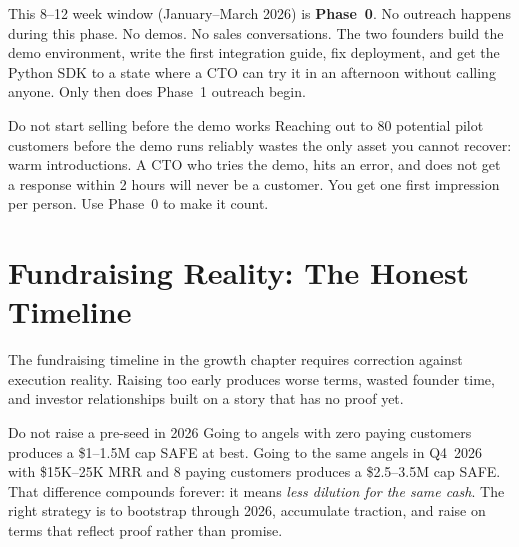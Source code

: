 \noindent This 8--12 week window (January--March 2026) is \textbf{Phase~0}.
No outreach happens during this phase. No demos. No sales conversations.
The two founders build the demo environment, write the first integration
guide, fix deployment, and get the Python SDK to a state where a CTO can
try it in an afternoon without calling anyone. Only then does Phase~1
outreach begin.

\begin{warnbox}{Do not start selling before the demo works}
Reaching out to 80 potential pilot customers before the demo runs reliably
wastes the only asset you cannot recover: warm introductions. A CTO who
tries the demo, hits an error, and does not get a response within 2 hours
will never be a customer. You get one first impression per person.
Use Phase~0 to make it count.
\end{warnbox}

\section*{Fundraising Reality: The Honest Timeline}

The fundraising timeline in the growth chapter requires correction against
execution reality. Raising too early produces worse terms, wasted founder
time, and investor relationships built on a story that has no proof yet.

\begin{warnbox}{Do not raise a pre-seed in 2026}
Going to angels with zero paying customers produces a \$1--1.5M cap SAFE
at best. Going to the same angels in Q4~2026 with \$15K--25K MRR and
8 paying customers produces a \$2.5--3.5M cap SAFE. That difference
compounds forever: it means \emph{less dilution for the same cash}.
The right strategy is to bootstrap through 2026, accumulate traction,
and raise on terms that reflect proof rather than promise.
\end{warnbox}

